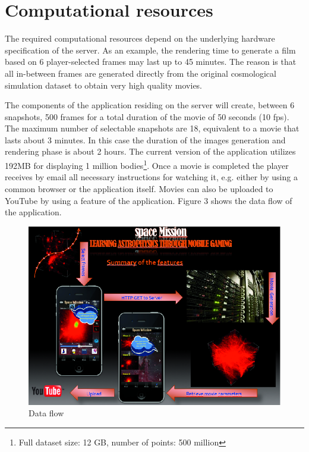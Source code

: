 \section{Computational resources}
The required computational resources depend on the underlying hardware specification of the server. As an example, the rendering time to generate a film based on 6 player-selected frames may last up to 45 minutes. The reason is that all in-between frames are generated directly from the original cosmological simulation dataset to obtain very high quality movies.\par
The components of the application residing on the server will  create, between  6 snapshots,
500 frames for a total duration of the movie of 50 seconds  (10 fps).
The maximum number of selectable snapshots are 18, equivalent  to a movie that lasts about 3 minutes. In this case the duration of the images generation and rendering phase is about  2 hours.
The current version of the application utilizes 192MB for displaying 1 million bodies\footnote{Full dataset size: 12 GB, number of points: 500 million}. Once a movie is completed the player receives by email all necessary instructions for watching it, e.g. either by using a common browser or the application itself. Movies can also be uploaded to YouTube by using a feature of the application.
Figure 3 shows the data flow of the application.\par
\begin{figure}[h]
\centering
\includegraphics[scale=0.9]{part5/Massimino_O24/P024_f3}
\caption{Data flow}
\end{figure}

